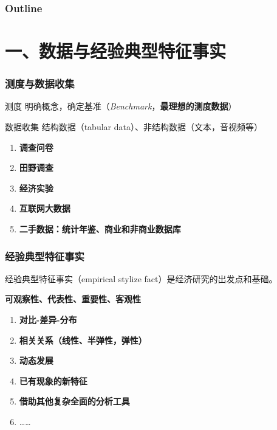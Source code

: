 \documentclass[aspectratio=169, 12pt]{beamer}
\begin{document}
\begin{frame}[plain]
    \frametitle{Outline}
    \tableofcontents[hideallsubsections]
  \end{frame}

\section{一、数据与经验典型特征事实}

\begin{frame}[plain]
    \frametitle{测度与数据收集}
    \begin{block}{测度}
        明确概念，确定基准（\emph{Benchmark}，\textbf{最理想的测度数据}）
    \end{block}
    \begin{block}{数据收集}
        结构数据（tabular data）、非结构数据（文本，音视频等）\par
        \addtolength{\parskip}{.8em}
        \begin{enumerate}
            \item  \textbf{调查问卷}
            \item  \textbf{田野调查}
            \item  \textbf{经济实验}
            \item  \textbf{互联网大数据}
            \item  \textbf{二手数据：统计年鉴、商业和非商业数据库}
        \end{enumerate}
    \end{block}
\end{frame}

\begin{frame}[plain]
    \frametitle{经验典型特征事实}
    经验典型特征事实（empirical stylize fact）是经济研究的出发点和基础。\par
    \textbf{可观察性、代表性、重要性、客观性} \par
    \addtolength{\parskip}{.8em}
    \begin{enumerate}
        \item  \textbf{对比-差异-分布}
        \item  \textbf{相关关系（线性、半弹性，弹性）}
        \item  \textbf{动态发展}
        \item  \textbf{已有现象的新特征}
        \item  \textbf{借助其他复杂全面的分析工具}
        \item  \ldots\ldots
    \end{enumerate}
\end{frame}
\end{document}
